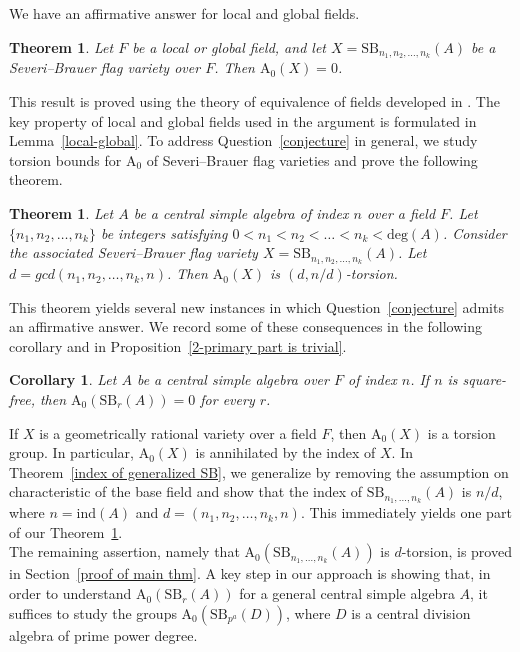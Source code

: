 \documentclass[10pt]{amsart}
\theoremstyle{plain}
\newtheorem{theorem}[thm]{Theorem}
\newtheorem{corollary}[thm]{Corollary}
\theoremstyle{definition}
\begin{document}
We have an affirmative answer for local and global fields.
\begin{theorem}\label{vanishing over local and global}
Let \(F\) be a local or global field, and let \(X = \mathrm{SB}_{n_1,n_2,\dots,n_k}(A)\) be a Severi–Brauer flag variety over \(F\). Then \(\mathrm{A_0}(X)=0\).
\end{theorem}
This result is proved using the theory of equivalence of fields developed in \cite{MC}. The key property of local and global fields used in the argument is formulated in Lemma~\ref{local-global}. To address Question~\ref{conjecture} in general, we study torsion bounds for \(\mathrm{A_0}\) of Severi--Brauer flag varieties and prove the following theorem.
\begin{theorem}\label{main theorem}
 Let \(A\) be a central simple algebra of index \(n\) over a field \(F\). Let \(\{n_1,n_2,\dots,n_k\}\) be integers satisfying \(0<n_1 < n_2 < \dots < n_k < \text{deg}(A)\). Consider the associated Severi--Brauer flag variety \(X = \mathrm{SB}_{n_1,n_2,\dots,n_k}(A)\). Let \(d=gcd(n_1,n_2,\dots,n_k,n)\). Then \(\mathrm{A_0}(X)\) is \((d,n/d)\)-torsion.
\end{theorem}
This theorem yields several new instances in which Question~\ref{conjecture} admits an affirmative answer. We record some of these consequences in the following corollary and in Proposition~\ref{2-primary part is trivial}.
\begin{corollary}\label{coro}
Let \(A\) be a central simple algebra over \(F\) of index \(n\). If \(n\) is square-free, then \(\mathrm{A_0}(\mathrm{SB}_r(A)) = 0\) for every \(r\).
\end{corollary}
If \(X\) is a geometrically rational variety over a field \(F\),  then \(\mathrm{A_0}(X)\) is a torsion group. In particular, \(\mathrm{A_0}(X)\) is annihilated by the index of \(X\). In Theorem~\ref{index of generalized SB}, we generalize \cite[Lemma 7.1]{zerocycle} by removing the assumption on characteristic of the base field and show that the index of \(\mathrm{SB}_{n_1,\ldots,n_k}(A)\) is \(n/d\), where \(n = \mathrm{ind}(A)\) and \(d = (n_1,n_2,\dots,n_k,n)\). This immediately yields one part of our Theorem~\ref{main theorem}.\\
The remaining assertion, namely that \(\mathrm{A_0}(\mathrm{SB}_{n_1,\ldots,n_k}(A))\) is \(d\)-torsion, is proved in Section~\ref{proof of main thm}.
A key step in our approach is showing that, in order to understand \(\mathrm{A_0}(\mathrm{SB}_r(A))\) for a general central simple algebra \(A\), it suffices to study the groups \(\mathrm{A_0}(\mathrm{SB}_{p^a}(D))\), where \(D\) is a central division algebra of prime power degree. 
\end{document}
